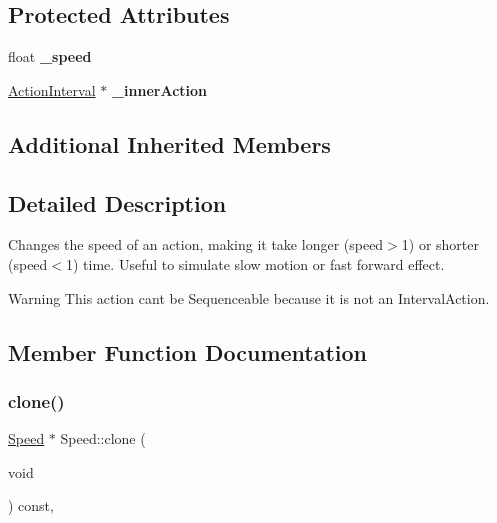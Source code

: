 \subsection*{Protected Attributes}
\begin{DoxyCompactItemize}
\item 
\mbox{\label{classSpeed_af7b6ad2f18aba71450acfaaa5f8a7803}} 
float {\bfseries \+\_\+speed}
\item 
\mbox{\label{classSpeed_a363f1bdd79ebc720201844985291c176}} 
\hyperlink{classActionInterval}{Action\+Interval} $\ast$ {\bfseries \+\_\+inner\+Action}
\end{DoxyCompactItemize}
\subsection*{Additional Inherited Members}


\subsection{Detailed Description}
Changes the speed of an action, making it take longer (speed$>$1) or shorter (speed$<$1) time. Useful to simulate \textquotesingle{}slow motion\textquotesingle{} or \textquotesingle{}fast forward\textquotesingle{} effect. 

\begin{DoxyWarning}{Warning}
This action can\textquotesingle{}t be Sequenceable because it is not an Interval\+Action. 
\end{DoxyWarning}


\subsection{Member Function Documentation}
\mbox{\label{classSpeed_a3c7ac785094cbc7bc3a5428e6464c9bc}} 
\subsubsection{\texorpdfstring{clone()}{clone()}\hspace{0.1cm}{\footnotesize\ttfamily [1/2]}}
{\footnotesize\ttfamily \hyperlink{classSpeed}{Speed} $\ast$ Speed\+::clone (\begin{DoxyParamCaption}\item[{void}]{ }\end{DoxyParamCaption}) const\hspace{0.3cm}{\ttfamily [override]}, {\ttfamily [virtual]}}

